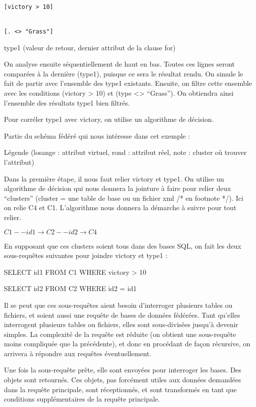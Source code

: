 \lstset{language=SQL}
\begin{lstlisting}
[victory > 10]


[. <> "Grass"]
\end{lstlisting}

type1 (valeur de retour, dernier attribut de la clause for)

On analyse ensuite séquentiellement de haut en bas. Toutes ces lignes seront comparées à la dernière (type1), puisque ce sera le résultat rendu. On simule le fait de partir avec l’ensemble des type1 existants. Ensuite, on filtre cette ensemble avec les conditions (victory > 10) et (type <> “Grass”). On obtiendra ainsi l’ensemble des résultats type1 bien filtrés.



Pour corréler type1 avec victory, on utilise un algorithme de décision.

Partie du schéma fédéré qui nous intéresse dans cet exemple :

Légende (losange : attribut virtuel, rond : attribut réel, note : cluster où trouver l’attribut)

Dans la première étape, il nous faut relier victory et type1. On utilise un algorithme de décision qui nous donnera la jointure à faire pour relier deux “clusters” (cluster = une table de base ou un fichier xml /* en footnote */). Ici on relie C4 et C1. L’algorithme nous donnera la démarche à suivre pour tout relier.

$C1 --id1 \rightarrow C2 --id2 \rightarrow  C4$

En supposant que ces clusters soient tous dans des bases SQL, on fait les deux sous-requêtes suivantes pour joindre victory et type1 :

SELECT id1 FROM C1 WHERE victory > 10

SELECT id2 FROM C2 WHERE id2 = id1


Il se peut que ces sous-requêtes aient besoin d’interroger plusieurs tables ou fichiers, et soient aussi une requête de bases de données fédérées. Tant qu’elles interrogent plusieurs tables ou fichiers, elles sont sous-divisées jusqu’à devenir simples. La complexité de la requête est réduite (on obtient une sous-requête moins compliquée que la précédente), et donc en procédant de façon récursive, on arrivera à répondre aux requêtes éventuellement.

Une fois la sous-requête prête, elle sont envoyées pour interroger les bases. Des objets sont retournés. Ces objets, pas forcément utiles aux données demandées dans la requête principale, sont réceptionnés, et sont transformés en tant que conditions supplémentaires de la requête principale.

